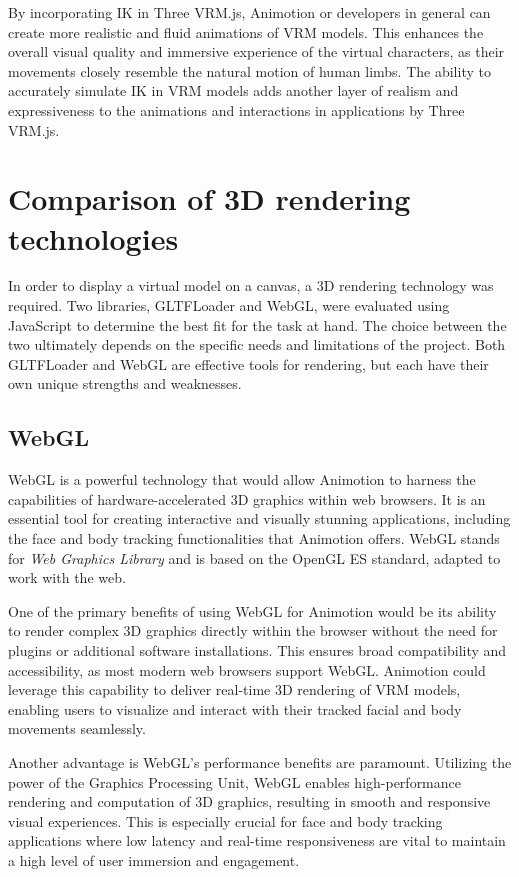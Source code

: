 By incorporating IK in Three VRM.js, Animotion or developers in general can create more realistic and fluid animations of VRM models. 
This enhances the overall visual quality and immersive experience of the virtual characters, as their movements 
closely resemble the natural motion of human limbs. The ability to accurately simulate IK in VRM models adds another 
layer of realism and expressiveness to the animations and interactions in applications by Three VRM.js. \cite{ikinthree}

\section{Comparison of 3D rendering technologies}
In order to display a virtual model on a canvas, a 3D rendering technology was required. Two libraries, 
GLTFLoader and WebGL, were evaluated using JavaScript to determine the best fit for the task at hand. 
The choice between the two ultimately depends on the specific needs and limitations of the project. 
Both GLTFLoader and WebGL are effective tools for rendering, but each have their own 
unique strengths and weaknesses.

\subsection{WebGL}
WebGL is a powerful technology that would allow Animotion to harness the capabilities of hardware-accelerated 3D graphics within web browsers. 
It is an essential tool for creating interactive and visually stunning applications, including the face and body tracking 
functionalities that Animotion offers. WebGL stands for \emph{Web Graphics Library} and is based on the OpenGL 
ES standard, adapted to work with the web. \cite{WebGL}

One of the primary benefits of using WebGL for Animotion would be its ability to render complex 3D graphics directly 
within the browser without the need for plugins or additional software installations. This ensures broad 
compatibility and accessibility, as most modern web browsers support WebGL. Animotion could leverage this 
capability to deliver real-time 3D rendering of VRM models, enabling users to visualize and interact 
with their tracked facial and body movements seamlessly. 

Another advantage is WebGL's performance benefits are paramount. Utilizing the power of the Graphics Processing Unit, WebGL 
enables high-performance rendering and computation of 3D graphics, resulting in smooth and responsive visual 
experiences. This is especially crucial for face and body tracking applications where low latency and real-time 
responsiveness are vital to maintain a high level of user immersion and engagement. \cite{WebGLAdvantages}

